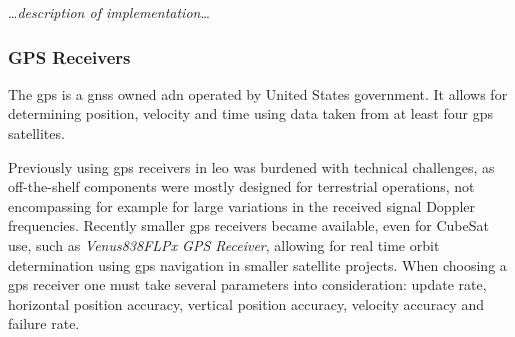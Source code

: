 
        \dots\textit{description of implementation}\dots

    \subsubsection{GPS Receivers}
        The \ac{gps} is a \ac{gnss} owned adn operated by United States government. It allows for determining position, velocity and time using data taken from at least four \ac{gps} satellites.

        Previously using \ac{gps} receivers in \ac{leo} was burdened with technical challenges, as off-the-shelf components were mostly designed for terrestrial operations, not encompassing for example for large variations in the received signal Doppler frequencies. Recently smaller \ac{gps} receivers became available, even for CubeSat use, such as \textit{Venus838FLPx GPS Receiver}\cite{gpsdatasheet}, allowing for real time orbit determination using \ac{gps} navigation in smaller satellite projects.\cite{gomes2007real} When choosing a \ac{gps} receiver one must take several parameters into consideration: update rate, horizontal position accuracy, vertical position accuracy, velocity accuracy and failure rate.
        

